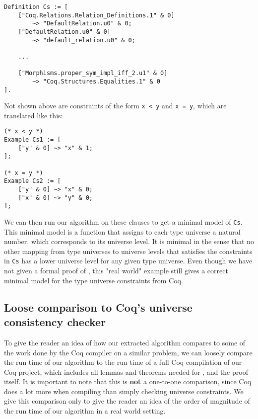 \begin{minipage}{\linewidth}
\begin{lstlisting}[language=Coq, label={lst:universe_hierarchy_clauses}, caption={Universe hierarchy as clauses}]
Definition Cs := [
    ["Coq.Relations.Relation_Definitions.1" & 0]
        ~> "DefaultRelation.u0" & 0;
    ["DefaultRelation.u0" & 0]
        ~> "default_relation.u0" & 0;

    ...

    ["Morphisms.proper_sym_impl_iff_2.u1" & 0]
        ~> "Coq.Structures.Equalities.1" & 0
].
\end{lstlisting}
\end{minipage}

Not shown above are constraints of the form \lstinline{x < y} and \lstinline{x = y},
which are translated like this:

\begin{minipage}{\linewidth}
\begin{lstlisting}[language=Coq, label={lst:constraints_to_clauses_trans}, caption={Other forms of constraints translated to clauses}]
(* x < y *)
Example Cs1 := [
    ["y" & 0] ~> "x" & 1;
];

(* x = y *)
Example Cs2 := [
    ["y" & 0] ~> "x" & 0;
    ["x" & 0] ~> "y" & 0;
];
\end{lstlisting}
\end{minipage}

We can then run our algorithm on these clauses to get a minimal model of \lstinline{Cs}.
This minimal model is a function that assigns to each type universe a natural number,
which corresponds to its universe level. It is minimal in the sense that no other mapping from
type universes to universe levels that satisfies the constraints in \lstinline{Cs} has a lower
universe level for any given type universe.
Even though we have not given a formal proof of ,
this "real world" example still gives a correct minimal model for the type universe constraints from Coq.

\subsection{Loose comparison to Coq's universe consistency checker}

To give the reader an idea of how our extracted algorithm compares to some of
the work done by the Coq compiler on a similar problem, we can
loosely compare the run time of our algorithm to the run time of
a full Coq compilation of our Coq project, which includes all
lemmas and theorems needed for , and the proof itself.
It is important to note that this is \textbf{not} a one-to-one comparison,
since Coq does a lot more when compiling than simply checking universe constraints.
We give this comparison only to give the reader an idea of the order of magnitude of the run time of our algorithm
in a real world setting.

